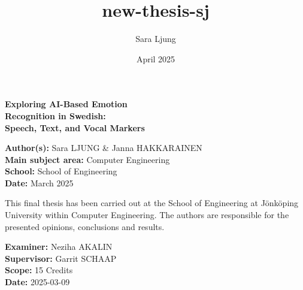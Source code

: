 \documentclass[a4paper, 12pt]{report}
\title{new-thesis-sj}
\author{Sara Ljung}
\date{April 2025}
\begin{document}

\vspace{6cm}
\begin{titlepage}
    \thispagestyle{empty} %


    \vspace*{6cm}
    \begin{center}
        \fontsize{30pt}{38pt}\selectfont\bfseries
        Exploring AI-Based Emotion \\
        Recognition in Swedish: \\
        Speech, Text, and Vocal Markers
    \end{center}

    \vfill
    
    \textbf{Author(s):} Sara LJUNG \&{} Janna HAKKARAINEN \\  %
    \textbf{Main subject area:} Computer Engineering \\
    \textbf{School:} School of Engineering \\
    \textbf{Date:} March 2025

\end{titlepage}

\newpage
\vspace*{20cm}
\noindent
This final thesis has been carried out at the School of Engineering at J\"onk\"oping University within Computer Engineering. The authors are responsible for the presented opinions, conclusions and results.

\vspace{0.5cm}

\noindent\textbf{Examiner:} Neziha AKALIN \\
\textbf{Supervisor:} Garrit SCHAAP \\
\textbf{Scope:} 15 Credits \\
\textbf{Date:} 2025-03-09

\newpage
\tableofcontents









\printbibliography
\end{document}
